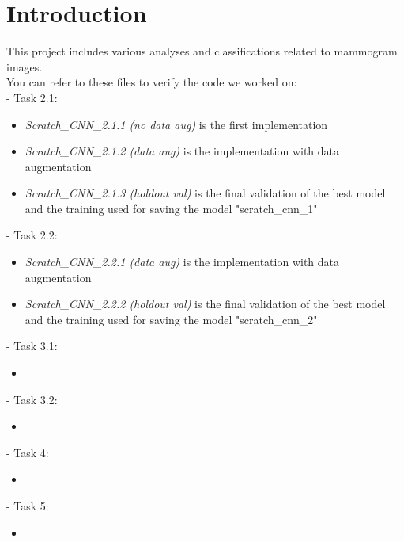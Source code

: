 \documentclass[11pt,a4paper,oneside]{article}
\begin{document}
\baselineskip 22pt


\tableofcontents\thispagestyle{empty}\clearpage

\section{Introduction}
\baselineskip 12pt

This project includes various analyses and classifications related to mammogram images. \\
You can refer to these files to verify the code we worked on:\\
- Task 2.1:
\begin{itemize}
\item \textit{Scratch\_CNN\_2.1.1 (no data aug)} is the first implementation
\item \textit{Scratch\_CNN\_2.1.2 (data aug)} is the implementation with data augmentation
\item \textit{Scratch\_CNN\_2.1.3 (holdout val)} is the final validation of the best model and the training used for saving the model "scratch\_cnn\_1"
\end{itemize}
- Task 2.2:
\begin{itemize}
\item \textit{Scratch\_CNN\_2.2.1 (data aug)} is the implementation with data augmentation
\item \textit{Scratch\_CNN\_2.2.2 (holdout val)} is the final validation of the best model and the training used for saving the model "scratch\_cnn\_2"
\end{itemize}
- Task 3.1:
\begin{itemize}
\item 
\end{itemize}
- Task 3.2:
\begin{itemize}
\item 
\end{itemize}
- Task 4:
\begin{itemize}
\item 
\end{itemize}
- Task 5:
\begin{itemize}
\item 
\end{itemize}
\end{document}
